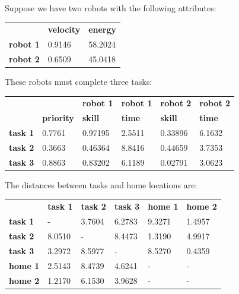 \documentclass[a4paper]{article}
\begin{document}
Suppose we have two robots with the following attributes:

\begin{center}
\begin{tabular}{lll}
        & \textbf{velocity} & \textbf{energy} \\
\textbf{robot 1} & 0.9146   & 58.2024          \\
\textbf{robot 2} & 0.6509   & 45.0418
\end{tabular}
\end{center}
\vspace{1em}

These robots must complete three tasks:

\begin{center}
\begin{tabular}{llllll}
                &                   & \textbf{robot 1} & \textbf{robot 1} & \textbf{robot 2} & \textbf{robot 2} \\
                & \textbf{priority} & \textbf{skill}   & \textbf{time}    & \textbf{skill}   & \textbf{time} \\
\textbf{task 1} & 0.7761            & 0.97195          & 2.5511           & 0.33896          & 6.1632        \\
\textbf{task 2} & 0.3663            & 0.46364          & 8.8416           & 0.44659          & 3.7353        \\
\textbf{task 3} & 0.8863            & 0.83202          & 6.1189           & 0.02791          & 3.0623
\end{tabular}
\end{center}
\vspace{1em}

The distances between tasks and home locations are:

\begin{center}
\begin{tabular}{llllll}
                & \textbf{task 1} & \textbf{task 2} & \textbf{task 3} & \textbf{home 1} & \textbf{home 2} \\
\textbf{task 1} &   -             & 3.7604          & 6.2783          & 9.3271          & 1.4957 \\
\textbf{task 2} & 8.0510          &   -             & 8.4473          & 1.3190          & 4.9917 \\
\textbf{task 3} & 3.2972          & 8.5977          &   -             & 8.5270          & 0.4359 \\
\textbf{home 1} & 2.5143          & 8.4739          & 4.6241          &    -            &    -   \\
\textbf{home 2} & 1.2170          & 6.1530          & 3.9628          &    -            &    -
\end{tabular}
\end{center}
\end{document}
